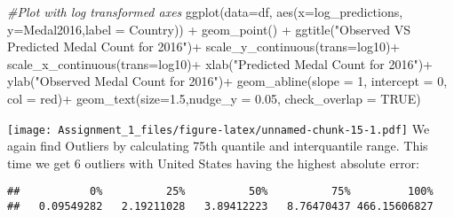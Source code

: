 \documentclass[
]{article}
\newenvironment{Shaded}{\begin{snugshade}}{\end{snugshade}}
\newcommand{\AttributeTok}[1]{\textcolor[rgb]{0.77,0.63,0.00}{#1}}
\newcommand{\CommentTok}[1]{\textcolor[rgb]{0.56,0.35,0.01}{\textit{#1}}}
\newcommand{\ConstantTok}[1]{\textcolor[rgb]{0.00,0.00,0.00}{#1}}
\newcommand{\DecValTok}[1]{\textcolor[rgb]{0.00,0.00,0.81}{#1}}
\newcommand{\FloatTok}[1]{\textcolor[rgb]{0.00,0.00,0.81}{#1}}
\newcommand{\FunctionTok}[1]{\textcolor[rgb]{0.00,0.00,0.00}{#1}}
\newcommand{\NormalTok}[1]{#1}
\newcommand{\SpecialCharTok}[1]{\textcolor[rgb]{0.00,0.00,0.00}{#1}}
\newcommand{\StringTok}[1]{\textcolor[rgb]{0.31,0.60,0.02}{#1}}
\begin{document}
\begin{Shaded}
\begin{Highlighting}[]
\CommentTok{\#Plot with log transformed axes}
\FunctionTok{ggplot}\NormalTok{(}\AttributeTok{data=}\NormalTok{df, }\FunctionTok{aes}\NormalTok{(}\AttributeTok{x=}\NormalTok{log\_predictions, }\AttributeTok{y=}\NormalTok{Medal2016,}\AttributeTok{label =}\NormalTok{ Country)) }\SpecialCharTok{+}
  \FunctionTok{geom\_point}\NormalTok{() }\SpecialCharTok{+}
  \FunctionTok{ggtitle}\NormalTok{(}\StringTok{"Observed VS Predicted Medal Count for 2016"}\NormalTok{)}\SpecialCharTok{+}
  \FunctionTok{scale\_y\_continuous}\NormalTok{(}\AttributeTok{trans=}\StringTok{\textquotesingle{}log10\textquotesingle{}}\NormalTok{)}\SpecialCharTok{+}
  \FunctionTok{scale\_x\_continuous}\NormalTok{(}\AttributeTok{trans=}\StringTok{\textquotesingle{}log10\textquotesingle{}}\NormalTok{)}\SpecialCharTok{+}
  \FunctionTok{xlab}\NormalTok{(}\StringTok{"Predicted Medal Count for 2016"}\NormalTok{)}\SpecialCharTok{+}
  \FunctionTok{ylab}\NormalTok{(}\StringTok{"Observed Medal Count for 2016"}\NormalTok{)}\SpecialCharTok{+}
  \FunctionTok{geom\_abline}\NormalTok{(}\AttributeTok{slope =} \DecValTok{1}\NormalTok{, }\AttributeTok{intercept =} \DecValTok{0}\NormalTok{, }\AttributeTok{col =} \StringTok{\textquotesingle{}red\textquotesingle{}}\NormalTok{)}\SpecialCharTok{+}
  \FunctionTok{geom\_text}\NormalTok{(}\AttributeTok{size=}\FloatTok{1.5}\NormalTok{,}\AttributeTok{nudge\_y =} \FloatTok{0.05}\NormalTok{,  }\AttributeTok{check\_overlap =} \ConstantTok{TRUE}\NormalTok{)}
\end{Highlighting}
\end{Shaded}

\texttt{[image: Assignment\_1\_files/figure-latex/unnamed-chunk-15-1.pdf]}
We again find Outliers by calculating 75th quantile and interquantile
range. This time we get 6 outliers with United States having the highest
absolute error:

\begin{Shaded}
\end{Shaded}

\begin{verbatim}
##           0%          25%          50%          75%         100% 
##   0.09549282   2.19211028   3.89412223   8.76470437 466.15606827
\end{verbatim}
\end{document}
